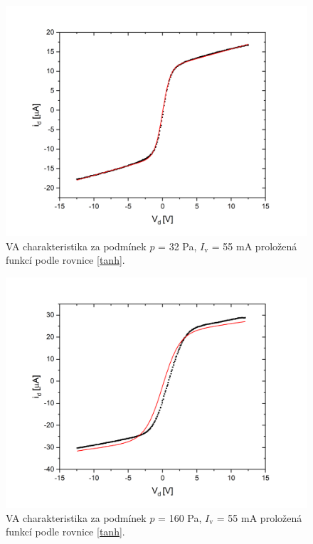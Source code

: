 \documentclass[a4paper,12pt]{article}
\begin{document}
\begin{figure}[h!]
	\centering
	\includegraphics[width=130mm]{tanh2.png}
	\caption{VA charakteristika za podmínek $p$ = 32 \si{\pascal}, $I_\text{{v}}$ = 55 \si{\milli\ampere} proložená funkcí podle rovnice \eqref{tanh}.}
	\label{tanh2}
\end{figure}

\newpage
\begin{figure}[h!]
	\centering
	\includegraphics[width=130mm]{tanh3.png}
	\caption{VA charakteristika za podmínek $p$ = 160 \si{\pascal}, $I_\text{{v}}$ = 55 \si{\milli\ampere} proložená funkcí podle rovnice \eqref{tanh}.}
	\label{tanh3}
\end{figure}
\end{document}
